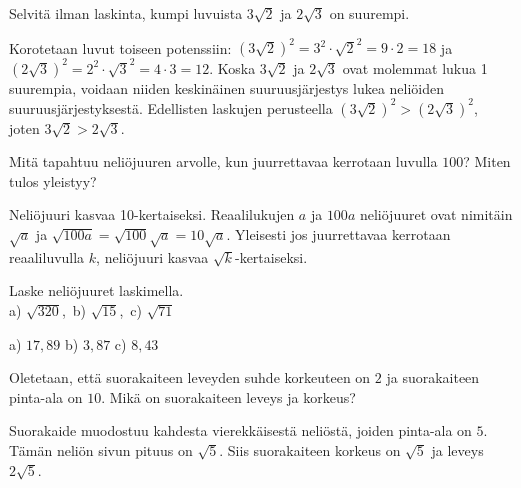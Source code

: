 \begin{tehtavasivu}
\begin{tehtava}
        Selvitä ilman laskinta, kumpi luvuista $3\sqrt{2}$ ja $2\sqrt{3}$ on suurempi. 
       
        \begin{vastaus}
        Korotetaan luvut toiseen potenssiin: $(3\sqrt{2})^2=3^2\cdot\sqrt{2}^2=9 \cdot 2=18$ ja $(2\sqrt{3})^2=2^2\cdot\sqrt{3}^2=4 \cdot 3=12$. Koska $3\sqrt{2}$ ja $2\sqrt{3}$ ovat molemmat lukua 1 suurempia, voidaan niiden keskinäinen suuruusjärjestys lukea neliöiden suuruusjärjestyksestä. Edellisten laskujen perusteella $(3\sqrt{2})^2 > (2\sqrt{3})^2$, joten $3\sqrt{2} > 2\sqrt{3}$.
        \end{vastaus}
\end{tehtava}

\begin{tehtava}
Mitä tapahtuu neliöjuuren arvolle, kun juurrettavaa kerrotaan luvulla $100$? Miten tulos yleistyy?
       
        \begin{vastaus}
        Neliöjuuri kasvaa 10-kertaiseksi. Reaalilukujen $a$ ja $100a$ neliöjuuret ovat nimitäin $\sqrt{a}$ ja $\sqrt{100a}=\sqrt{100}\sqrt{a}=10\sqrt{a}$. Yleisesti jos juurrettavaa kerrotaan reaaliluvulla $k$, neliöjuuri kasvaa $\sqrt{k}$-kertaiseksi.
        \end{vastaus}
\end{tehtava}

\begin{tehtava}
Laske neliöjuuret laskimella.\\
a) $\sqrt{320}$,\ b) $\sqrt{15}$,\ c) $\sqrt{71}$
\begin{vastaus}
a) $17,89$ b) $3,87$ c) $8,43$
\end{vastaus}
\end{tehtava}

\begin{tehtava}
Oletetaan, että suorakaiteen leveyden suhde korkeuteen on $2$ ja suorakaiteen pinta-ala on $10$. Mikä on suorakaiteen leveys ja korkeus?
\begin{vastaus}
Suorakaide muodostuu kahdesta vierekkäisestä neliöstä, joiden pinta-ala on $5$. Tämän neliön sivun pituus on $\sqrt{5}$. Siis suorakaiteen korkeus on $\sqrt{5}$ ja leveys $2\sqrt{5}$.
\end{vastaus}
\end{tehtava}


\end{tehtavasivu}
